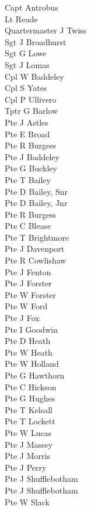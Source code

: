 \begin{multicols}{3}
  Capt Antrobus \\
  Lt Reade \\
  Quartermaster J Twiss \\
  Sgt J Broadhurst \\
  Sgt G Lowe \\
  Sgt J Lomas \\
  Cpl W Baddeley \\
  Cpl S Yates \\
  Cpl P Ullivero \\
  Tptr G Barlow \\
  Pte J Astles \\
  Pte E Broad \\
  Pte R Burgess \\
  Pte J Baddeley \\
  Pte G Buckley \\
  Pte T Bailey \\
  Pte D Bailey, Snr \\
  Pte D Bailey, Jnr \\
  Pte R Burgess \\
  Pte C Blease \\
  Pte T Brightmore \\
  Pte J Davenport \\
  Pte R Cowlishaw \\
  Pte J Fenton \\
  Pte J Forster \\
  Pte W Forster \\
  Pte W Ford \\
  Pte J Fox \\
  Pte I Goodwin \\
  Pte D Heath \\
  Pte W Heath \\
  Pte W Holland \\
  Pte G Hawthorn \\
  Pte C Hickson \\
  Pte G Hughes \\
  Pte T Kelsall \\
  Pte T Lockett \\
  Pte W Lucas \\
  Pte J Massey \\
  Pte J Morris \\
  Pte J Perry \\
  Pte J Shufflebotham \\
  Pte J Shufflebotham \\
  Pte W Slack \\

\end{multicols}
